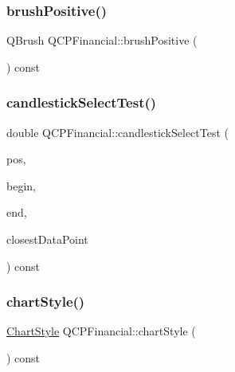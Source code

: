 \subsubsection{\texorpdfstring{brush\+Positive()}{brushPositive()}}
{\footnotesize\ttfamily Q\+Brush Q\+C\+P\+Financial\+::brush\+Positive (\begin{DoxyParamCaption}{ }\end{DoxyParamCaption}) const\hspace{0.3cm}{\ttfamily [inline]}}

\mbox{\label{class_q_c_p_financial_a9783e91a33fd08a402b1a3821d43e471}} 
\subsubsection{\texorpdfstring{candlestick\+Select\+Test()}{candlestickSelectTest()}}
{\footnotesize\ttfamily double Q\+C\+P\+Financial\+::candlestick\+Select\+Test (\begin{DoxyParamCaption}\item[{const Q\+PointF \&}]{pos,  }\item[{const \hyperlink{class_q_c_p_data_container_ae40a91f5cb0bcac61d727427449b7d15}{Q\+C\+P\+Financial\+Data\+Container\+::const\+\_\+iterator} \&}]{begin,  }\item[{const \hyperlink{class_q_c_p_data_container_ae40a91f5cb0bcac61d727427449b7d15}{Q\+C\+P\+Financial\+Data\+Container\+::const\+\_\+iterator} \&}]{end,  }\item[{\hyperlink{class_q_c_p_data_container_ae40a91f5cb0bcac61d727427449b7d15}{Q\+C\+P\+Financial\+Data\+Container\+::const\+\_\+iterator} \&}]{closest\+Data\+Point }\end{DoxyParamCaption}) const\hspace{0.3cm}{\ttfamily [protected]}}

\mbox{\label{class_q_c_p_financial_a5243371c1fde30fdae00555d7760ec2d}} 
\subsubsection{\texorpdfstring{chart\+Style()}{chartStyle()}}
{\footnotesize\ttfamily \hyperlink{class_q_c_p_financial_a0f800e21ee98d646dfc6f8f89d10ebfb}{Chart\+Style} Q\+C\+P\+Financial\+::chart\+Style (\begin{DoxyParamCaption}{ }\end{DoxyParamCaption}) const\hspace{0.3cm}{\ttfamily [inline]}}


